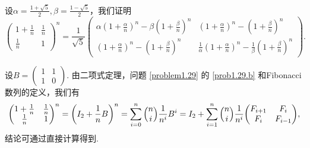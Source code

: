 \begin{solution}
  设$\alpha=\frac{1+\sqrt5}2,\beta=\frac{1-\sqrt5}2$，我们证明
  \[
    \begin{pmatrix}
      1 + \frac1n & \frac1n \\
      \frac1n & 1
    \end{pmatrix}^n =
    \frac1{\sqrt5} \begin{pmatrix}
      \alpha \left(1+\frac\alpha n\right)^n - \beta\left(1 + \frac\beta n\right)^n &  \left(1+\frac\alpha n\right)^n - \left(1 + \frac\beta n\right)^n \\
      \left(1+\frac\alpha n\right)^n - \left(1 + \frac\beta n\right)^n & \frac1\alpha \left(1+\frac\alpha n\right)^n - \frac1\beta\left(1 + \frac\beta n\right)^n
    \end{pmatrix}.
  \]

  设$B=\begin{pmatrix}
    1 & 1 \\
    1 & 0
  \end{pmatrix}$. 由二项式定理，问题 \ref{problem1.29} 的 \ref{prob1.29.b} 和Fibonacci数列的定义，我们有
  \[
    \begin{pmatrix}
      1 + \frac1n & \frac1n \\
      \frac1n & 1
    \end{pmatrix}^n = \left( I_2 + \frac1nB\right)^n = \sum_{i=0}^n\Binom ni \frac1{n^i}B^i = I_2 + \sum_{i=1}^n\Binom ni\frac1{n^i} \begin{pmatrix}
      F_{i+1} & F_i \\
      F_i & F_{i-1}
    \end{pmatrix},
  \]
  结论可通过直接计算得到.
\end{solution}

